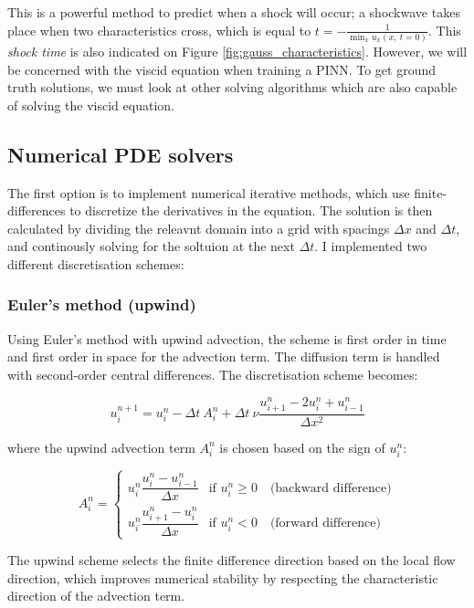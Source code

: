 \documentclass[we,twoside,openright,a4paper,11pt]{uantwerpenbamathesis}
\begin{document}
This is a powerful method to predict when a shock will occur; a shockwave takes place when two characteristics cross, which is equal to $t = -\frac{1}{\min_x u_x(x,\ t=0)}$. This \textit{shock time} is also indicated on Figure \ref{fig:gauss_characteristics}. However, we will be concerned with the viscid equation when training a PINN. To get ground truth solutions, we must look at other solving algorithms which are also capable of solving the viscid equation.

\subsection{Numerical PDE solvers}
The first option is to implement numerical iterative methods, which use finite-differences to discretize the derivatives in the equation. The solution is then calculated by dividing the releavnt domain into a grid with spacings $\Delta x$ and $\Delta t$, and continously solving for the soltuion at the next $\Delta t$. I implemented two different discretisation schemes:

\subsubsection{Euler's method (upwind)}
Using Euler's method with upwind advection, the scheme is first order in time and first order in space for the advection term. The diffusion term is handled  with second-order central differences. The discretisation scheme becomes:

\begin{equation}
    u_i^{n+1} = u_i^n - \Delta t \ A_i^n + \Delta t \ \nu \frac{u_{i+1}^n - 2u_i^n + u_{i-1}^n}{\Delta x^2}
\end{equation}

where the upwind advection term $A_i^n$ is chosen based on the sign of $u_i^n$:

\begin{equation}
    A_i^n = \begin{cases}
        u_i^n \dfrac{u_i^n - u_{i-1}^n}{\Delta x} & \text{if } u_i^n \geq 0 \quad \text{(backward difference)} \\[10pt]
        u_i^n \dfrac{u_{i+1}^n - u_i^n}{\Delta x} & \text{if } u_i^n < 0 \quad \text{(forward difference)}
    \end{cases}
\end{equation}

The upwind scheme selects the finite difference direction based on the local flow direction, which improves numerical stability by respecting the characteristic direction of the advection term.
\end{document}
